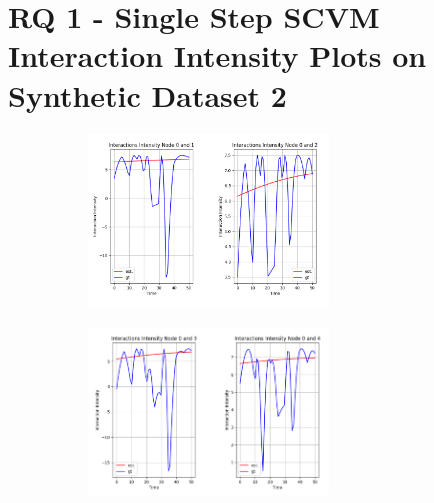 \section{RQ 1 - Single Step SCVM Interaction Intensity Plots on Synthetic Dataset 2}
\label{appendix:rq1:part2:1step_intensity}
\begin{figure}[H]
    \centering
    \begin{subfigure}[b]{\textwidth}
        \centering
        \includegraphics[width=0.7\textwidth]{0_images/rq1_2_1step_intensity_plot_appendix1.PNG}
    \end{subfigure}
    \vfill
    \begin{subfigure}[b]{\textwidth}
        \centering
        \includegraphics[width=0.7\textwidth]{0_images/rq1_2_1step_intensity_plot_appendix2.PNG}
    \end{subfigure}
\end{figure}
